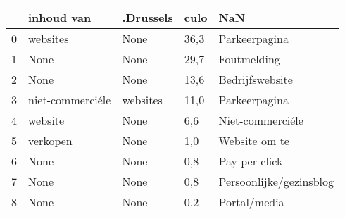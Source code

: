 \begin{tabular}{lllll}
\toprule
{} &        inhoud van & .Drussels &  culo &                      NaN \\
\midrule
0 &          websites &      None &  36,3 &            Parkeerpagina \\
1 &              None &      None &  29,7 &              Foutmelding \\
2 &              None &      None &  13,6 &          Bedrijfswebsite \\
3 &  niet-commerciéle &  websites &  11,0 &            Parkeerpagina \\
4 &           website &      None &   6,6 &         Niet-commerciéle \\
5 &          verkopen &      None &   1,0 &            Website om te \\
6 &              None &      None &   0,8 &            Pay-per-click \\
7 &              None &      None &   0,8 &  Persoonlijke/gezinsblog \\
8 &              None &      None &   0,2 &             Portal/media \\
\bottomrule
\end{tabular}
